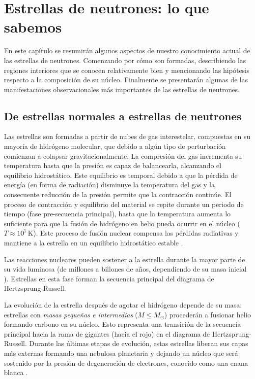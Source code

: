 \chapter{Estrellas de neutrones: lo que sabemos}

\noindent En este capítulo se resumirán algunos aspectos de nuestro conocimiento actual de las estrellas de neutrones. Comenzando por cómo son formadas, describiendo las regiones interiores que se conocen relativamente bien y mencionando las hipótesis respecto a la composición de su núcleo. Finalmente se presentarán algunas de las manifestaciones observacionales más importantes de las estrellas de neutrones.


\section{De estrellas normales a estrellas de neutrones}

\noindent Las estrellas son formadas a partir de nubes de gas interestelar, compuestas en su mayoría de hidrógeno molecular, que debido a algún tipo de perturbación comienzan a colapsar gravitacionalmente. La compresión del gas incrementa su temperatura hasta que la presión es capaz de balancearla, alcanzando el equilibrio hidrostático. Este equilibrio es temporal debido a que la pérdida de energía (en forma de radiación) disminuye la temperatura del gas y la consecuente reducción de la presión permite que la contracción continúe. El proceso de contracción y equilibrio del material se repite durante un periodo de tiempo (fase pre-secuencia principal), hasta que la temperatura aumenta lo suficiente para que la fusión de hidrógeno en helio pueda ocurrir en el núcleo ($T\approx 10^7\,\si{\kelvin}$). Este proceso de fusión nuclear compensa las pérdidas radiativas y mantiene a la estrella en un equilibrio hidrostático estable \cite{Scilla2016}.

Las reacciones nucleares pueden sostener a la estrella durante la mayor parte de su vida luminosa (de millones a billones de años, dependiendo de su masa inicial \cite{Salaris2005}). Estrellas en esta fase forman la secuencia principal del diagrama de Hertzsprung-Russell.

La evolución de la estrella después de agotar el hidrógeno depende de su masa: estrellas con \emph{masas pequeñas e intermedias} ($M\leq M_{\odot}$) procederán a fusionar helio formando carbono en su núcleo. Esto representa una transición de la secuencia principal hacia la rama de gigantes (hacia el rojo) en el diagrama de Hertzsprung-Russell. Durante las últimas etapas de evolución, estas estrellas liberan sus capas más externas formando una nebulosa planetaria y dejando un núcleo que será sostenido por la presión de degeneración de electrones, conocido como una enana blanca \cite{Padmanabhan2000}.

